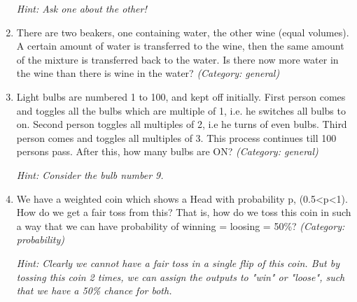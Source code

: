 \begin{enumerate}
\small\emph{Hint: Ask one about the other!}





\item There are two beakers, one containing water, the other wine (equal volumes). A certain amount of water is transferred to the wine, then the same amount of the mixture is transferred back to the water. Is there now more water in the wine than there is wine in the water?
\small\emph{(Category: general)}




\item Light bulbs are numbered 1 to 100, and kept off initially. First person comes and toggles all the bulbs which are multiple of 1, i.e. he switches all bulbs to on. Second person toggles all multiples of 2, i.e he turns of even bulbs. Third person comes and toggles all multiples of 3. This process continues till 100 persons pass. After this, how many bulbs are  ON?
\small\emph{(Category: general)}

\small\emph{Hint: Consider the bulb number 9.}





\item We have a weighted coin which shows a Head with probability p, (0.5<p<1). How do we get a fair toss from this? That is, how do we toss this coin in such a way that we can have probability of winning = loosing = 50\%?
\small\emph{(Category: probability)}

\small\emph{Hint: Clearly we cannot have a fair toss in a single flip of this coin. But by tossing this coin 2 times, we can assign the outputs to "win" or "loose", such that we have a 50\% chance for both.}






\end{enumerate}
